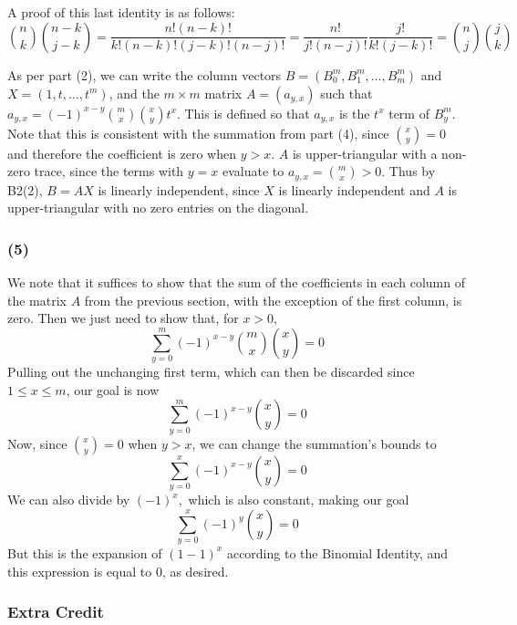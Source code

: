 \documentclass{article}
\begin{document}
A proof of this last identity is as follows:
\[\binom{n}{k}\binom{n-k}{j-k} = \frac{n!(n-k)!}{k!(n-k)!(j-k)!(n-j)!}
=\frac{n!}{j!(n-j)!}\frac{j!}{k!(j-k)!} = \binom{n}{j}\binom{j}{k}\]

\medskip
As per part (2), we can write the column vectors
$B = \displaystyle{(B_0^m, B_1^m,\dots,B_m^m)}$ and $X = (1,t,\dots,t^m)$,
and the $m\times m$ matrix
$A = (a_{y,x})$ such that $a_{y,x} = (-1)^{x - y} \binom{m}{x}\binom{x}{y}t^x$.
This is defined so that $a_{y,x}$ is the $t^x$ term of $B^m_y$.
Note that this is consistent with the summation from part (4), since 
$\binom{x}{y} = 0$ and therefore the coefficient is zero when $y > x$. 
$A$ is upper-triangular with a non-zero trace, since the terms with $y=x$
evaluate to $a_{y,x} = \binom{m}{x} > 0$.
Thus by B2(2), $B = AX$ is linearly independent, since $X$ is linearly
independent and $A$ is upper-triangular with no zero entries on the diagonal.

\subsubsection{(5)}
We note that it suffices to show that the sum of the coefficients in each column
of the matrix $A$ from the previous section, with the exception of the first
column, is zero.
Then we just need to show that, for $x > 0,$
\[\sum_{y=0}^m (-1)^{x-y} \binom{m}{x}\binom{x}{y} = 0\]
Pulling out the unchanging first term, which can then be discarded since
$1 \leq x \leq m$, our goal is now
\[\sum_{y=0}^m (-1)^{x-y}\binom{x}{y} = 0\]
Now, since $\binom{x}{y} = 0$ when $y > x$, we can change the summation's bounds
to
\[\sum_{y=0}^x (-1)^{x-y}\binom{x}{y} = 0\]
We can also divide by $(-1)^x,$ which is also constant, making our goal
\[\sum_{y=0}^x(-1)^y \binom{x}{y} = 0\]
But this is the expansion of $(1 - 1)^x$ according to the Binomial Identity,
and this expression is equal to $0$, as desired.

\subsubsection{Extra Credit}
\end{document}
